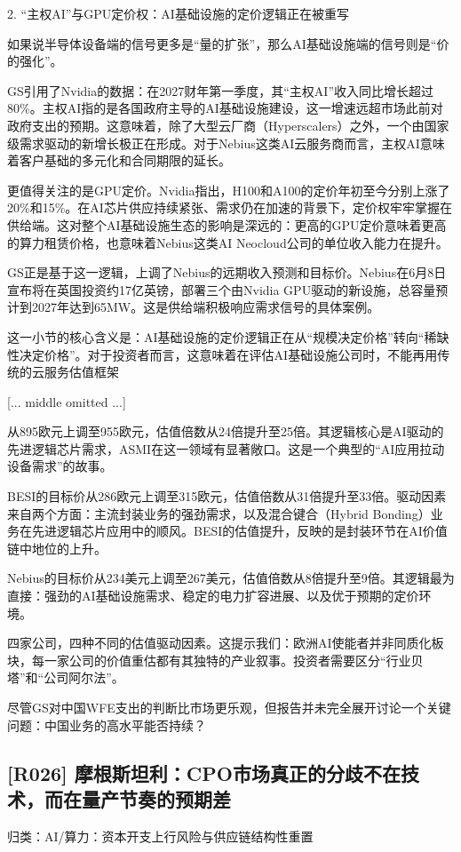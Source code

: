 \documentclass[11pt]{ctexart}
\begin{document}
2. “主权AI”与GPU定价权：AI基础设施的定价逻辑正在被重写

如果说半导体设备端的信号更多是“量的扩张”，那么AI基础设施端的信号则是“价的强化”。

GS引用了Nvidia的数据：在2027财年第一季度，其“主权AI”收入同比增长超过80\%。主权AI指的是各国政府主导的AI基础设施建设，这一增速远超市场此前对政府支出的预期。这意味着，除了大型云厂商（Hyperscalers）之外，一个由国家级需求驱动的新增长极正在形成。对于Nebius这类AI云服务商而言，主权AI意味着客户基础的多元化和合同期限的延长。

更值得关注的是GPU定价。Nvidia指出，H100和A100的定价年初至今分别上涨了20\%和15\%。在AI芯片供应持续紧张、需求仍在加速的背景下，定价权牢牢掌握在供给端。这对整个AI基础设施生态的影响是深远的：更高的GPU定价意味着更高的算力租赁价格，也意味着Nebius这类AI Neocloud公司的单位收入能力在提升。

GS正是基于这一逻辑，上调了Nebius的远期收入预测和目标价。Nebius在6月8日宣布将在英国投资约17亿英镑，部署三个由Nvidia GPU驱动的新设施，总容量预计到2027年达到65MW。这是供给端积极响应需求信号的具体案例。

这一小节的核心含义是：AI基础设施的定价逻辑正在从“规模决定价格”转向“稀缺性决定价格”。对于投资者而言，这意味着在评估AI基础设施公司时，不能再用传统的云服务估值框架

[... middle omitted ...]

从895欧元上调至955欧元，估值倍数从24倍提升至25倍。其逻辑核心是AI驱动的先进逻辑芯片需求，ASMI在这一领域有显著敞口。这是一个典型的“AI应用拉动设备需求”的故事。

BESI的目标价从286欧元上调至315欧元，估值倍数从31倍提升至33倍。驱动因素来自两个方面：主流封装业务的强劲需求，以及混合键合（Hybrid Bonding）业务在先进逻辑芯片应用中的顺风。BESI的估值提升，反映的是封装环节在AI价值链中地位的上升。

Nebius的目标价从234美元上调至267美元，估值倍数从8倍提升至9倍。其逻辑最为直接：强劲的AI基础设施需求、稳定的电力扩容进展、以及优于预期的定价环境。

四家公司，四种不同的估值驱动因素。这提示我们：欧洲AI使能者并非同质化板块，每一家公司的价值重估都有其独特的产业叙事。投资者需要区分“行业贝塔”和“公司阿尔法”。

尽管GS对中国WFE支出的判断比市场更乐观，但报告并未完全展开讨论一个关键问题：中国业务的高水平能否持续？

\subsection{[R026] 摩根斯坦利：CPO市场真正的分歧不在技术，而在量产节奏的预期差}
{\small\color{refgray}归类：AI/算力：资本开支上行风险与供应链结构性重置}
\end{document}
